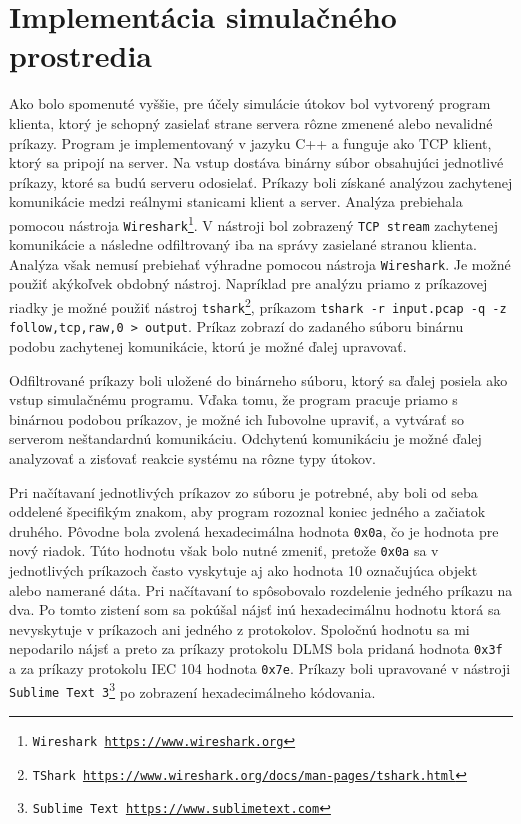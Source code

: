 \section{Implementácia simulačného prostredia}
\tab Ako bolo spomenuté vyššie, pre účely simulácie útokov bol vytvorený program klienta, ktorý je schopný zasielať strane servera rôzne zmenené alebo nevalidné príkazy. Program je implementovaný v jazyku C++ a funguje ako TCP klient, ktorý sa pripojí na server. Na vstup dostáva binárny súbor obsahujúci jednotlivé príkazy, ktoré sa budú serveru odosielať. Príkazy boli získané analýzou zachytenej komunikácie medzi reálnymi stanicami klient a server. Analýza prebiehala pomocou nástroja {\tt Wireshark\footnote{Wireshark \url{https://www.wireshark.org}}}. V nástroji bol zobrazený {\tt TCP stream} zachytenej komunikácie a následne odfiltrovaný iba na správy zasielané stranou klienta. Analýza však nemusí prebiehať výhradne pomocou nástroja {\tt Wireshark}. Je možné použiť akýkoľvek obdobný nástroj. Napríklad pre analýzu priamo z príkazovej riadky je možné použiť nástroj {\tt tshark\footnote{TShark \url{https://www.wireshark.org/docs/man-pages/tshark.html}}}, príkazom {\tt tshark -r input.pcap -q -z follow,tcp,raw,0 > output}. Príkaz zobrazí do zadaného súboru binárnu podobu zachytenej komunikácie, ktorú je možné ďalej upravovať. \par
Odfiltrované príkazy boli uložené do binárneho súboru, ktorý sa ďalej posiela ako vstup simulačnému programu. Vďaka tomu, že program pracuje priamo s binárnou podobou príkazov, je možné ich ľubovolne upraviť, a vytvárať so serverom neštandardnú komunikáciu. Odchytenú komunikáciu je možné ďalej analyzovať a zisťovať reakcie systému na rôzne typy útokov. \par
Pri načítavaní jednotlivých príkazov zo súboru je potrebné, aby boli od seba oddelené špecifikým znakom, aby program rozoznal koniec jedného a začiatok druhého. Pôvodne bola zvolená hexadecimálna hodnota {\tt 0x0a}, čo je hodnota pre nový riadok. Túto hodnotu však bolo nutné zmeniť, pretože {\tt 0x0a} sa v jednotlivých príkazoch často vyskytuje aj ako hodnota 10 označujúca objekt alebo namerané dáta. Pri načítavaní to spôsobovalo rozdelenie jedného príkazu na dva. Po tomto zistení som sa pokúšal nájsť inú hexadecimálnu hodnotu ktorá sa nevyskytuje v príkazoch ani jedného z protokolov. Spoločnú hodnotu sa mi nepodarilo nájsť a preto za príkazy protokolu DLMS bola pridaná hodnota {\tt 0x3f} a za príkazy protokolu IEC 104 hodnota {\tt 0x7e}. Príkazy boli upravované v nástroji {\tt Sublime Text 3\footnote{Sublime Text \url{https://www.sublimetext.com}}} po zobrazení hexadecimálneho kódovania. \par 

